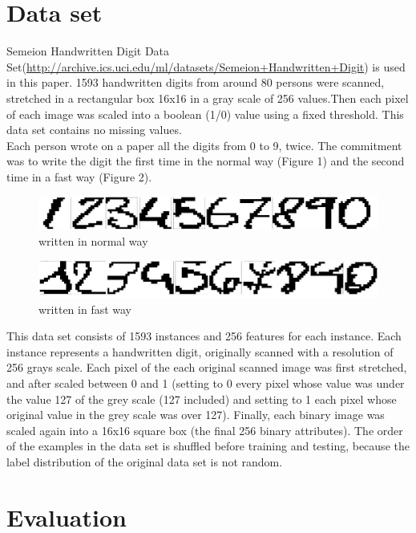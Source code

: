 \documentclass[a4paper,11pt]{article}
\begin{document}
\section{Data set}
Semeion Handwritten Digit Data Set(\url{http://archive.ics.uci.edu/ml/datasets/Semeion+Handwritten+Digit}) is used in this paper. 1593 handwritten digits from around 80 persons were scanned, stretched in a rectangular box 16x16 in a gray scale of 256 values.Then each pixel of each image was scaled into a boolean (1/0) value using a fixed threshold. This data set contains no missing values.\\
Each person wrote on a paper all the digits from 0 to 9, twice. The commitment was to write the digit the first time in the normal way (Figure 1) and the second time in a fast way (Figure 2).
\begin{figure}
\centering
\includegraphics[width=1.0\textwidth]{clear}
\caption{written in normal way}
\end{figure}

\begin{figure}
\centering
\includegraphics[width=1.0\textwidth]{unclear}
\caption{written in fast way}
\end{figure}
This data set consists of 1593 instances and 256 features for each instance. Each instance represents a handwritten digit, originally scanned with a resolution of 256 grays scale.
Each pixel of the each original scanned image was first stretched, and after scaled between 0 and 1 (setting to 0 every pixel whose value was under the value 127 of the grey scale (127 included) and setting to 1 each pixel whose original value in the grey scale was over 127).
Finally, each binary image was scaled again into a 16x16 square box (the final 256 binary attributes).
The order of the examples in the data set is shuffled before training and testing, because the label distribution of the original data set is not random.
\section{Evaluation}
\end{document}
